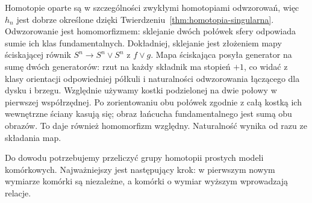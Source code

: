 Homotopie oparte są w
szczególności zwykłymi
homotopiami odwzorowań, więc
$h_n$ jest dobrze
określone dzięki
Twierdzeniu~\ref{thm:homotopia-singularna}.
Odwzorowanie jest homomorfizmem:
sklejanie dwóch połówek
sfery odpowiada sumie
ich klas fundamentalnych.
Dokładniej, sklejanie jest złożeniem mapy ściskającej równik
$S^n\to S^n\vee S^n$ z $f\vee g$. Mapa ściskająca posyła
generator na sumę dwóch generatorów: rzut na każdy składnik
ma stopień $+1$, co widać z klasy orientacji odpowiedniej półkuli
i naturalności odwzorowania łączącego dla dysku i brzegu.
Względnie używamy kostki podzielonej na dwie połowy w pierwszej współrzędnej.
Po zorientowaniu obu połówek zgodnie z całą kostką ich wewnętrzne
ściany kasują się; obraz łańcucha fundamentalnego jest sumą obu obrazów.
To daje również homomorfizm względny. Naturalność wynika od razu ze składania map.

Do dowodu potrzebujemy
przeliczyć grupy homotopii
prostych modeli komórkowych.
Najważniejszy jest
następujący krok: w
pierwszym nowym wymiarze
komórki są niezależne,
a komórki o wymiar
wyższym wprowadzają
relacje.

